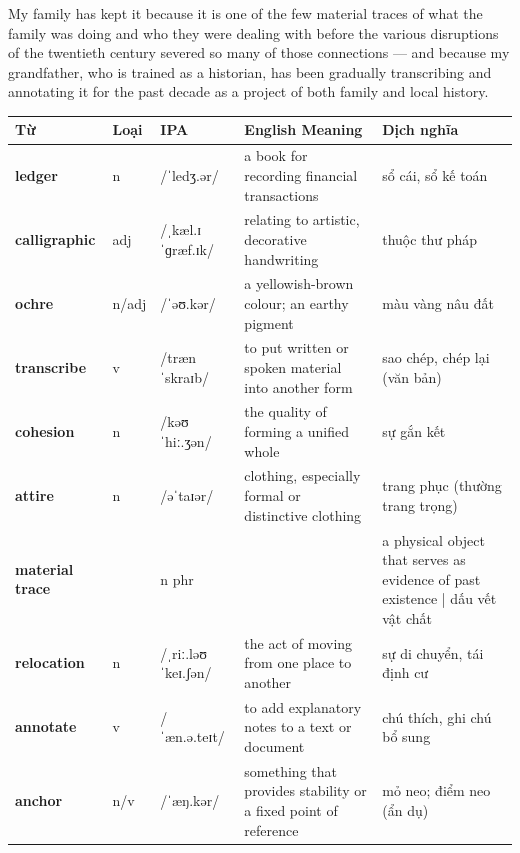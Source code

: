 \begin{ieltsanswer}
My family has kept it because it is one of the few material traces of what the family was doing and who they were dealing with before the various disruptions of the twentieth century severed so many of those connections — and because my grandfather, who is trained as a historian, has been gradually transcribing and annotating it for the past decade as a project of both family and local history.
\end{ieltsanswer}


\vspace{0.8em}
\begin{center}
\renewcommand{\arraystretch}{1.65}
\begin{tabularx}{\textwidth}{|V{0.22\textwidth}|C{0.07\textwidth}|I{0.20\textwidth}|Y|V{0.18\textwidth}|}
\hline
{}
\textbf{Từ} & \textbf{Loại} & \textbf{IPA} & \textbf{English Meaning} & \textbf{Dịch nghĩa} \\
\hline
\textbf{ledger} & n & /ˈledʒ.ər/ & a book for recording financial transactions & sổ cái, sổ kế toán \\ \hline
\textbf{calligraphic} & adj & /ˌkæl.ɪˈɡræf.ɪk/ & relating to artistic, decorative handwriting & thuộc thư pháp \\ \hline
\textbf{ochre} & n/adj & /ˈəʊ.kər/ & a yellowish-brown colour; an earthy pigment & màu vàng nâu đất \\ \hline
\textbf{transcribe} & v & /trænˈskraɪb/ & to put written or spoken material into another form & sao chép, chép lại (văn bản) \\ \hline
\textbf{cohesion} & n & /kəʊˈhiː.ʒən/ & the quality of forming a unified whole & sự gắn kết \\ \hline
\textbf{attire} & n & /əˈtaɪər/ & clothing, especially formal or distinctive clothing & trang phục (thường trang trọng) \\ \hline
\textbf{material trace} & & n phr & & a physical object that serves as evidence of past existence | dấu vết vật chất \\ \hline
\textbf{relocation} & n & /ˌriː.ləʊˈkeɪ.ʃən/ & the act of moving from one place to another & sự di chuyển, tái định cư \\ \hline
\textbf{annotate} & v & /ˈæn.ə.teɪt/ & to add explanatory notes to a text or document & chú thích, ghi chú bổ sung \\ \hline
\textbf{anchor} & n/v & /ˈæŋ.kər/ & something that provides stability or a fixed point of reference & mỏ neo; điểm neo (ẩn dụ) \\ \hline
\end{tabularx}
\end{center}

